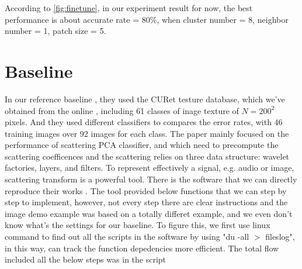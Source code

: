 \documentclass[final,leqno,onefignum,onetabnum]{siamltexmm}
\begin{document}
According to \ref{fig:finetune}, in our experiment result for now, the best performance is about accurate rate = 80\%, when cluster number = 8, neighbor number = 1, patch size = 5.


\section{Baseline}
In our reference baseline \cite{baseline}, they used the CURet testure database, which we've obtained from the online \cite{dataset_mod}, including 61 classes of inage texture of $N=200^2$ pixels. And they used different classifiers to compares the error rates, with 46 training images over 92 images for each class.
The paper mainly focused on the performance of scattering PCA classifier, and which need to precompute the scattering coefficences and the scattering relies on three data structure: wavelet factories, layers, and filters. To represent effectively a signal, e.g. audio or image, scattering transform is a powerful tool. There is the software that we can directly reproduce their works \cite{baseline_software}. 
The tool provided below functions that we can step by step to implement, however, not every step there are clear instructions and the image demo example \cite{baseline_software} was based on a totally differet example, and we even don't know what's the settings for our baseline. To figure this, we first use linux command to find out all the scripts in the software by using "du -all $>$ fileslog", in this way, can track the function depedencies more efficient. The total flow included all the below steps was in the script \cite{github_flow}
\end{document}
